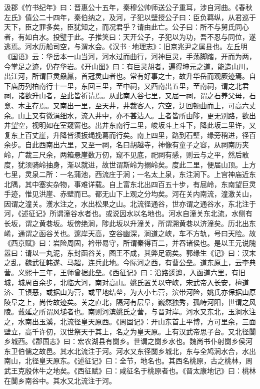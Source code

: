 \documentclass[12pt,UTF8]{ctexbook}
\begin{document}
汲郡《竹书纪年》曰：晋惠公十五年，秦穆公帅师送公子重耳，涉自河曲。《春秋左氏》僖公二十四年，秦伯纳之，及河，子犯以壁授公子曰：臣负羁纵，从君巡于天下，臣之罪多矣，臣犹知之，而况君乎？请由此亡。公子曰：所不与舅氏同心者，有如白水。投璧于此。子推笑曰：天开公子，子犯以为功，吾不忍与同位，遂逃焉。河水历船司空，与渭水会。《汉书·地理志》：旧京兆尹之属县也。左丘明《国语》云：华岳本一山当河，河水过而曲行，河神巨灵，手荡脚踏，开而为两，今掌足之迹，仍存华岩。《开山图》曰：有巨灵胡者，遍得坤元之道，能造山川，出江河，所谓巨灵赑屭，首冠灵山者也。常有好事之士，故升华岳而观厥迹焉。自下庙历列柏南行十一里，东回三里，至中祠，又西南出五里，至南祠，谓之北君祠，诸欲升山者，至此皆祈请焉。从此南入谷七里，又届一祠，谓之石养父母，石龛、木主存焉。又南出一里，至天井，井裁客人，穴空，迂回顿曲而上，可高六丈余。山上又有微涓细水，流入井中，亦不甚沾人。上者皆所由陟，更无别路，欲出井望空，视明如在室窥窗也。出井东南行二里，峻坂斗上斗下，降此坂二里许，又复东上百丈崖，升降皆须扳绳挽葛而行矣。南上四里，路到石壁，缘旁稍进，径百余步。自此西南出六里，又至一祠，名曰胡越寺，神像有童子之容，从祠南历夹岭，广裁三尺余，两箱悬崖数万仞，窥不见底，祀祠有感，则云与之平，然后敢度，犹须骑岭抽身，渐以就进，故世谓斯岭为搦岭矣。度此二里，便届山顶。上方七里，灵泉二所：一名蒲池，西流庄于涧；一名太上泉，东注涧下。上宫神庙近东北隅，其中塞实杂物，事难详载。自上富东北出四百五十步，有屈岭，东南望巨灵手迹，惟见洪崖、赤壁而已。都无山下上观之分均矣。河在关内南流，潼激关山，因谓之潼关。濩水注之，水出松果之山。北流径通谷，世亦谓之通谷水，东北注于河，《述征记》所谓潼谷水者也。或说因水以名地也。河水自潼关东北流，水侧有长坂，谓之黄巷坂。坂傍绝涧，陟此坂以升潼关，所谓溯黄巷以济潼矣。历北出东崤，通谓之函谷关也。邃岸天高，空谷幽深，涧道之峡，车不方轨，号曰天险。故《西京赋》曰：岩险周固，衿带易守，所谓秦得百二，并吞诸侯也。是以王元说隗嚣曰：请以一丸泥，东封函谷关，图王不成，其弊足霸矣。郭缘生《记》曰：汉末之乱，魏武征韩遂、马超，连兵此地。今际河之西，有曹公垒。道东原上，云李典营。义熙十三年，王师曾据此垒。《西征记》曰：沿路逶迆，入函道六里，有旧城，城周百余步，北临大河，南对高山。姚氏置关以守峡，宋武帝入长安，檀道济、王镇恶，或据山为营，或平地结垒，为大小七营，滨带河险，姚氏亦保据山原陵阜之上，尚传故迹矣。关之直北，隔河有层阜，巍然独秀，孤峙河阳，世谓之风陵。戴延之所谓风塠者也。南则河滨姚氏之营，与晋对岸。河水又东北，玉涧水注之，水南出玉溪，北流径皇天原西。《周固记》：开山东首上平博，方可里余，三面壁立，高千许仞，汉世祭天于其上，名之为皇天原。上有汉武帝思子台。又北径闅乡城西。《郡国志》曰：宏农湖县有闅乡。世谓之闅乡水也。魏尚书仆射闅乡侯河东卫伯儒之故邑。其水北流注于河。河水又东径闅乡城北，东与全鸠涧水合，水出南山，北径皇天原东。《述征记》曰：全节，地名也。其西名桃原，古之桃林，周武王克殷休牛之地矣。《西征赋》曰：咸征名于桃原者也。《晋太康地记》曰：桃林在闅乡南谷中。其水又北流注于河。
\end{document}
